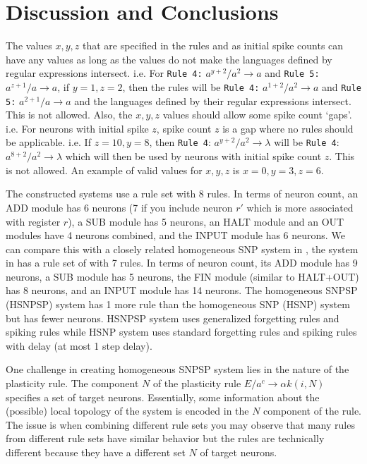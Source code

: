 \documentclass[smallextended]{svjour3}
\begin{document}

\section{Discussion and Conclusions} \label{sec-disc}

The values $x,y,z$ that are specified in the rules and as initial spike counts can have any values as long as the values do not make the languages
defined by regular expressions intersect. i.e. For \texttt{Rule 4:} $a^{y+2}/a^2 \rightarrow a$ and \texttt{Rule 5:} $a^{z+1}/a \rightarrow a$, if 
$y=1, z=2$, then the rules will be \texttt{Rule 4:} $a^{1+2}/a^2 \rightarrow a$ and \texttt{Rule 5:} $a^{2+1}/a \rightarrow a$ and the languages
defined by their regular expressions intersect. This is not allowed. Also, the $x,y,z$ values should allow some spike count `gaps'. i.e. For neurons
with initial spike $z$, spike count $z$ is a gap where no rules should be applicable. i.e. If $z=10, y=8$, then \texttt{Rule 4}: $a^{y+2}/a^2 
\rightarrow \lambda$ will be \texttt{Rule 4}: $a^{8+2}/a^2 \rightarrow \lambda$ which will then be used by neurons with initial spike count $z$. This
is not allowed. An example of valid values for $x,y,z$ is $x=0, y=3, z=6$.

The constructed systems use a rule set with 8 rules. In terms of neuron count, an ADD module has 6 neurons (7 if you include neuron $r'$ which is more
associated with register $r$), a SUB module has 5 neurons, an HALT module and an OUT modules have 4 neurons combined, and the INPUT module has 6 
neurons. We can compare this with a closely related homogeneous SNP system in \cite{HSNP}, the system in \cite{HSNP} has a rule set of with 7 rules. In
terms of neuron count, its ADD module has 9 neurons, a SUB module has 5 neurons, the FIN module (similar to HALT+OUT) has 8 neurons, and an INPUT 
module has 14 neurons. The homogeneous SNPSP (HSNPSP) system has 1 more rule than the homogeneous SNP (HSNP) system but has fewer neurons. HSNPSP system
uses generalized forgetting rules and spiking rules while HSNP system uses standard forgetting rules and spiking rules with delay (at most 1 step 
delay).

One challenge in creating homogeneous SNPSP system lies in the nature of the plasticity rule. The component $N$ of the plasticity rule $E/a^c 
\rightarrow \alpha k(i,N)$ specifies a set of target neurons. Essentially, some information about the (possible) local topology of the system is 
encoded in the $N$ component of the rule. The issue is when combining different rule sets you may observe that many rules from different rule sets 
have similar behavior but the rules are technically different because they have a different set $N$ of target neurons.
\end{document}
